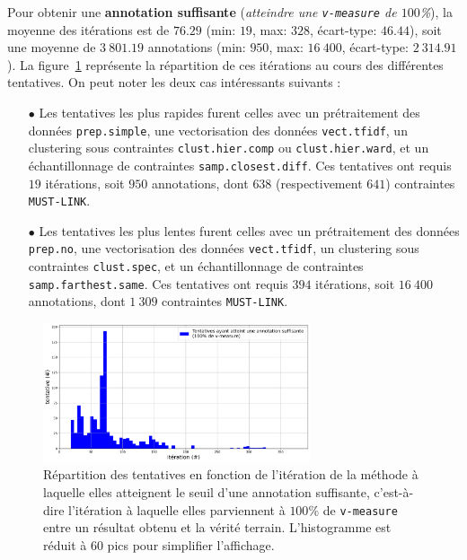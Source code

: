 			Pour obtenir une \textbf{annotation suffisante} (\textit{atteindre une \texttt{v-measure} de $100$\%}), la moyenne des itérations est de $76.29$ (min: $19$, max: $328$, écart-type: $46.44$), soit une moyenne de $3~801.19$ annotations (min: $950$, max: $16~400$, écart-type: $2~314.91$).
			La figure~\ref{figure:4.2.1-ETUDE-OPTIMISATION-HISTOGRAMME-ANNOTATION-SUFFISANTE} représente la répartition de ces itérations au cours des différentes tentatives.
			On peut noter les deux cas intéressants suivants :
			\begin{itemize}
				\item[$\bullet$] Les tentatives les plus rapides furent celles avec un prétraitement des données \texttt{prep.simple}, une vectorisation des données \texttt{vect.tfidf}, un clustering sous contraintes \texttt{clust.hier.comp} ou \texttt{clust.hier.ward}, et un échantillonnage de contraintes \texttt{samp.closest.diff}. Ces tentatives ont requis $19$ itérations, soit $950$ annotations, dont $638$ (respectivement $641$) contraintes \texttt{MUST-LINK}.
				\item[$\bullet$] Les tentatives les plus lentes furent celles avec un prétraitement des données \texttt{prep.no}, une vectorisation des données \texttt{vect.tfidf}, un clustering sous contraintes \texttt{clust.spec}, et un échantillonnage de contraintes \texttt{samp.farthest.same}. Ces tentatives ont requis $394$ itérations, soit $16~400$ annotations, dont $1~309$ contraintes \texttt{MUST-LINK}.
			\end{itemize}
			\begin{figure}[!htb]
				\centering
				\includegraphics[width=0.7\textwidth]{figures/etude-efficience-histogramme-annotation-suffisante}
				\caption{Répartition des tentatives en fonction de l'itération de la méthode à laquelle elles atteignent le seuil d'une annotation suffisante, c'est-à-dire l'itération à laquelle elles parviennent à $100$\% de \texttt{v-measure} entre un résultat obtenu et la vérité terrain. L'histogramme est réduit à $60$ pics pour simplifier l'affichage.}
				\label{figure:4.2.1-ETUDE-OPTIMISATION-HISTOGRAMME-ANNOTATION-SUFFISANTE}
			\end{figure}
